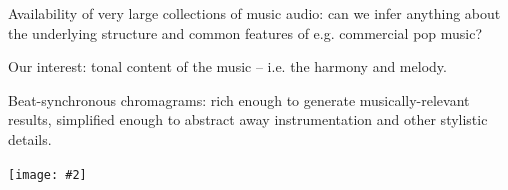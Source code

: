 \documentclass[portrait,a0b,final]{a0poster}
\newenvironment{poster}{
  \begin{center}
  \begin{minipage}[c]{0.98\textwidth}
}{
  \end{minipage} 
  \end{center}
}
\newenvironment{pcolumn}[1]{
  \begin{minipage}{#1\textwidth}
  \begin{center}
}{
  \end{center}
  \end{minipage}
}
\newcommand{\pbox}[4]{
\psshadowbox[#3]{
\begin{minipage}[t][#2][t]{#1}
#4
\end{minipage}
}}
\newcommand{\myfig}[3][0]{
\begin{center}
  \vspace{1.5cm}
  \texttt{[image: \#2]}
  \nobreak\medskip
\end{center}}
\begin{document}
\begin{poster}
\begin{center}
\begin{pcolumn}{0.98}
{\begin{minipage}[c][9cm][c]{0.1\textwidth}
  \begin{center}
    \includegraphics[width=7cm,angle=0]{seas-logo.eps}
  \end{center}
\end{minipage}

}
\end{pcolumn}
\end{center}

\vspace*{0.5cm}


\begin{multicols}{3}


\begin{center}
  \pbox{0.8\columnwidth}{}{linewidth=2mm,framearc=0.1,linecolor=lightred,fillstyle=gradient,gradangle=0,gradbegin=white,gradend=whitepink,gradmidpoint=1.0,framesep=1em}{
    \begin{center}
      \large Introduction
    \end{center}}
\end{center}

\vspace{1.0cm}

\begin{list}{}{\leftmargin=2em =1em}
\item Availability of very large collections of music audio:
can we infer anything about the underlying structure and common
features of e.g. commercial pop music?
\item Our interest: tonal content of the music -- i.e. the
harmony and melody.
\item Beat-synchronous chromagrams: rich enough
to generate musically-relevant results, simplified enough to
abstract away instrumentation and other stylistic details.
\end{list}

\myfig[0]{code_axis.ps}{.4}


\end{multicols}
\end{poster}
\end{document}
